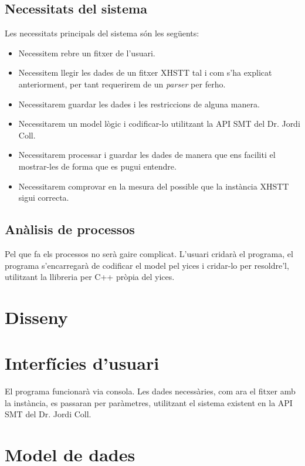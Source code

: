 \documentclass[11pt,a4paper,twoside]{report}
\begin{document}
  \subsection{Necessitats del sistema}
  Les necessitats principals del sistema són les següents: 
  \begin{itemize}
    \item Necessitem rebre un fitxer de l'usuari.
    \item Necessitem llegir les dades de un fitxer XHSTT tal i com s'ha explicat anteriorment, per tant requerirem de un \textit{parser} per ferho.
    \item Necessitarem guardar les dades i les restriccions de alguna manera.
    \item Necessitarem un model lògic i codificar-lo utilitzant la API SMT del Dr. Jordi Coll. 
    \item Necessitarem processar i guardar les dades de manera que ens faciliti el mostrar-les de forma que es pugui entendre.
    \item Necessitarem comprovar en la mesura del possible que la instància XHSTT sigui correcta.
  \end{itemize}

  \subsection{Anàlisis de processos}
  Pel que fa els processos no serà gaire complicat. L'usuari cridarà el programa, el programa s'encarregarà de codificar el model pel yices i cridar-lo per resoldre'l, utilitzant la llibreria per C++ pròpia del yices.


  
  \section{Disseny}    
  \section{Interfícies d'usuari}
  El programa funcionarà via consola. Les dades necessàries, com ara el fitxer amb la instància, es passaran per paràmetres, utilitzant el sistema existent en la API SMT del Dr. Jordi Coll.
  \section{Model de dades}
\end{document}
